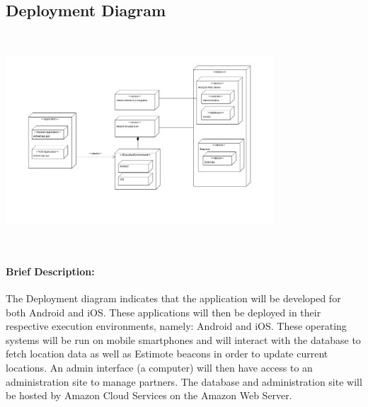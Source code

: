 \documentclass[11pt]{article}
\begin{document}
\subsection{Deployment Diagram}
\begin{center}
 \includegraphics[width=10cm, height=8cm]{Images/DeploymentDiagram.png}\\[1cm]
\end{center}

\paragraph{Brief Description:}The Deployment diagram indicates that the application will be developed for both Android and iOS. 
These applications will then be deployed in their respective execution environments, namely: Android and iOS.
These operating systems will be run on mobile smartphones and will interact with the database to fetch location data as well as Estimote beacons in order to update current locations.
An admin interface (a computer) will then have access to an administration site to manage partners.
The database and administration site will be hosted by Amazon Cloud Services on the Amazon Web Server.
\end{document}
